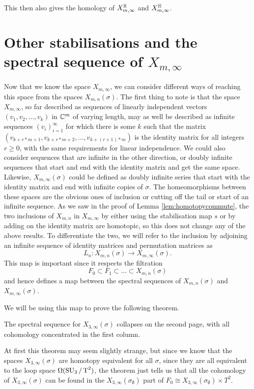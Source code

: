 This then also gives the homology of $X_{m,\infty}^{\mathbb{R}}$ and
$X_{m,\infty}^{\mathbb{H}}$.


\section{Other stabilisations and the spectral sequence of
  $X_{m,\infty}$}

Now that we know the space $X_{m,\infty}$, we can consider different
ways of reaching this space from the spaces $X_{m,n}(\sigma)$. The
first thing to note is that the space $X_{m,\infty}$, so far described
as sequences of linearly independent vectors $(v_1,v_2,\dots,v_k)$ in
$\mathbb{C}^m$ of varying length, may as well be described as infinite
sequences $(v_i)_{i=1}^\infty$ for which there is some $k$ such that
the matrix $(v_{k+r*m +1},v_{k+r*m +2},\dots,v_{k+(r+1)*m})$ is the
identity matrix for all integers $r \geq 0$, with the same
requirements for
linear independence. We could also consider sequences that are
infinite in the other direction, or
doubly infinite sequences
that start and end with the identity matrix
and get the same space. Likewise, $X_{m,\infty}(\sigma)$ could be
defined as doubly infinite series that start with the identity matrix
and end with infinite copies of $\sigma$. The homeomorphisms between
these spaces are the obvious ones of inclusion or cutting off the tail
or start of an infinite sequence. As we saw in the proof of Lemma
\ref{lem:homotopycommute}, the two inclusions of $X_{m,n}$ in
$X_{m,\infty}$ by either
using the stabilisation map $s$ or by adding on the identity matrix
are homotopic, so this does not change any of the above results. To
differentiate the two, we will refer to the inclusion by adjoining an
infinite sequence of identity matrices and permutation matrices as
\[ L_n : X_{m,n}(\sigma) \to X_{m,\infty}(\sigma). \]
This map is important since it respects the
filtration 
\[ F_0 \subset F_1 \subset \dots \subset X_{m,n}(\sigma) \]
and hence defines a map between the spectral sequences of
$X_{m,n}(\sigma)$ and $X_{m,\infty}(\sigma)$.

We will be using this map to prove the following theorem.
\begin{theorem}
  The spectral sequence for $X_{3,\infty}(\sigma)$ collapses on the
  second page, with all cohomology concentrated in the first column.
\end{theorem}
At first this theorem may seem slightly strange, but since we know
that the spaces $X_{3,\infty}(\sigma)$ are homotopy equivalent for all
$\sigma$, since they are all equivalent to the loop space
$\Omega(\operatorname{SU}_3/\operatorname{T}^2)$, the theorem
just tells us that all the cohomology of $X_{3,\infty}(\sigma)$ can be
found in the $X_{3,\infty}(\sigma_{\emptyset})$ part of $F_0 \cong
X_{3,\infty}(\sigma_{\emptyset})\times T^2$.

